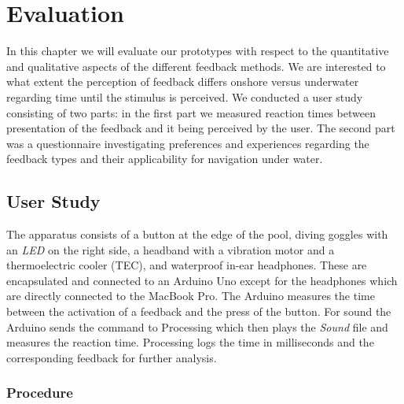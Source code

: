%

\chapter{Evaluation}
\label{evaluation}

In this chapter we will evaluate our prototypes with respect to the quantitative and qualitative aspects of the different feedback methods. We are interested to what extent the perception of feedback differs onshore versus underwater regarding time until the stimulus is perceived. 
We conducted a user study consisting of two parts: in the first part we measured reaction times between presentation of the feedback and it being perceived by the user.
The second part was a questionnaire investigating preferences and experiences regarding the feedback types and their applicability for navigation under water. 
  

\section{User Study}

The apparatus consists of a button at the edge of the pool, diving goggles with an \emph{LED} on the right side, a headband with a vibration motor and a thermoelectric cooler (TEC), and waterproof in-ear headphones. 
These are encapsulated and connected to an Arduino Uno except for the headphones which are directly connected to the MacBook Pro. 
The Arduino measures the time between the activation of a feedback and the press of the button. 
For sound the Arduino sends the command to Processing which then plays the \emph{Sound} file and measures the reaction time. 
Processing logs the time in milliseconds and the corresponding feedback for further analysis.

\subsection{Procedure}


